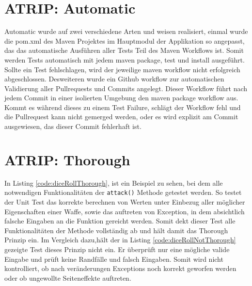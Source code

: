 \section{ATRIP: Automatic}
Automatic wurde auf zwei verschiedene Arten und weisen realisiert, einmal wurde die pom.xml des Maven Projektes im Hauptmodul der Applikation so angepasst, das das automatische Ausführen aller Tests Teil des Maven Workflows ist. Somit werden Tests automatisch mit jedem maven package, test und install ausgeführt. Sollte ein Test fehlschlagen, wird der jeweilige maven workflow nicht erfolgreich abgeschlossen. Desweiteren wurde ein Github workflow zur automatischen Validierung aller Pullrequests und Commits angelegt. Dieser Workflow führt nach jedem Commit in einer isolierten Umgebung den maven package workflow aus. Kommt es während dieses zu einem Test Failure, schlägt der Workflow fehl und die Pullrequest kann nicht gemerged werden, oder es wird explizit am Commit ausgewiesen, das dieser Commit fehlerhaft ist.

\clearpage
\section{ATRIP: Thorough}

In Listing \ref{code:diceRollThorough}, ist ein Beispiel zu sehen, bei dem alle notwendigen Funktionalitäten der \texttt{attack()} Methode getestet werden. So testet der Unit Test das korrekte berechnen von Werten unter Einbezug aller möglicher Eigenschaften einer Waffe, sowie das auftreten von Exception, in dem absichtlich falsche Eingaben an die Funktion gereicht werden. Somit dekt dieser Test alle Funktionalitäten der Methode vollständig ab und hält damit das Thorough Prinzip ein. Im Vergleich dazu,hält der in Listing \ref{code:diceRollNotThorough} gezeigte Test dieses Prinzip nicht ein. Er überprüft nur eine mögliche valide Eingabe und prüft keine Randfälle und falsch Eingaben. Somit wird nicht kontrolliert, ob nach veränderungen Exceptions noch korrekt geworfen werden oder ob ungewollte Seiteneffekte auftreten. 


